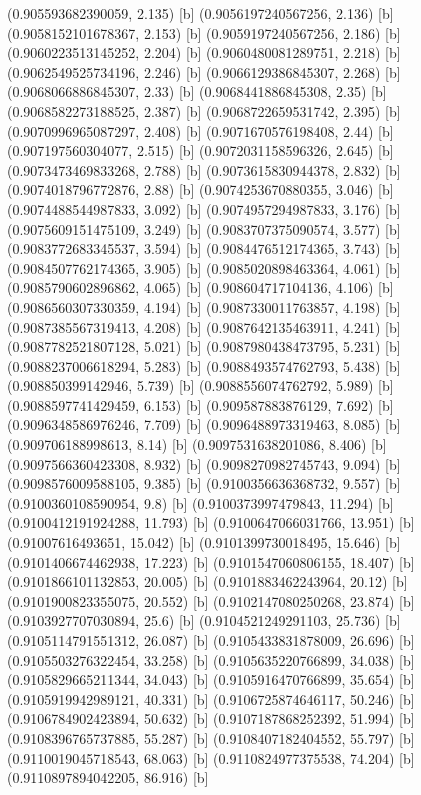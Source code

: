 {{{(0.905593682390059, 2.135) [b] 
(0.9056197240567256, 2.136) [b] 
(0.9058152101678367, 2.153) [b] 
(0.9059197240567256, 2.186) [b] 
(0.9060223513145252, 2.204) [b] 
(0.9060480081289751, 2.218) [b] 
(0.9062549525734196, 2.246) [b] 
(0.9066129386845307, 2.268) [b] 
(0.9068066886845307, 2.33) [b] 
(0.9068441886845308, 2.35) [b] 
(0.9068582273188525, 2.387) [b] 
(0.9068722659531742, 2.395) [b] 
(0.9070996965087297, 2.408) [b] 
(0.9071670576198408, 2.44) [b] 
(0.907197560304077, 2.515) [b] 
(0.9072031158596326, 2.645) [b] 
(0.9073473469833268, 2.788) [b] 
(0.9073615830944378, 2.832) [b] 
(0.9074018796772876, 2.88) [b] 
(0.9074253670880355, 3.046) [b] 
(0.9074488544987833, 3.092) [b] 
(0.9074957294987833, 3.176) [b] 
(0.9075609151475109, 3.249) [b] 
(0.9083707375090574, 3.577) [b] 
(0.9083772683345537, 3.594) [b] 
(0.9084476512174365, 3.743) [b] 
(0.9084507762174365, 3.905) [b] 
(0.9085020898463364, 4.061) [b] 
(0.9085790602896862, 4.065) [b] 
(0.908604717104136, 4.106) [b] 
(0.9086560307330359, 4.194) [b] 
(0.9087330011763857, 4.198) [b] 
(0.9087385567319413, 4.208) [b] 
(0.9087642135463911, 4.241) [b] 
(0.9087782521807128, 5.021) [b] 
(0.9087980438473795, 5.231) [b] 
(0.9088237006618294, 5.283) [b] 
(0.9088493574762793, 5.438) [b] 
(0.908850399142946, 5.739) [b] 
(0.9088556074762792, 5.989) [b] 
(0.9088597741429459, 6.153) [b] 
(0.909587883876129, 7.692) [b] 
(0.9096348586976246, 7.709) [b] 
(0.9096488973319463, 8.085) [b] 
(0.909706188998613, 8.14) [b] 
(0.9097531638201086, 8.406) [b] 
(0.9097566360423308, 8.932) [b] 
(0.9098270982745743, 9.094) [b] 
(0.9098576009588105, 9.385) [b] 
(0.9100356636368732, 9.557) [b] 
(0.9100360108590954, 9.8) [b] 
(0.9100373997479843, 11.294) [b] 
(0.9100412191924288, 11.793) [b] 
(0.9100647066031766, 13.951) [b] 
(0.91007616493651, 15.042) [b] 
(0.9101399730018495, 15.646) [b] 
(0.9101406674462938, 17.223) [b] 
(0.9101547060806155, 18.407) [b] 
(0.9101866101132853, 20.005) [b] 
(0.9101883462243964, 20.12) [b] 
(0.9101900823355075, 20.552) [b] 
(0.9102147080250268, 23.874) [b] 
(0.9103927707030894, 25.6) [b] 
(0.9104521249291103, 25.736) [b] 
(0.9105114791551312, 26.087) [b] 
(0.9105433831878009, 26.696) [b] 
(0.9105503276322454, 33.258) [b] 
(0.9105635220766899, 34.038) [b] 
(0.9105829665211344, 34.043) [b] 
(0.9105916470766899, 35.654) [b] 
(0.9105919942989121, 40.331) [b] 
(0.9106725874646117, 50.246) [b] 
(0.9106784902423894, 50.632) [b] 
(0.9107187868252392, 51.994) [b] 
(0.9108396765737885, 55.287) [b] 
(0.9108407182404552, 55.797) [b] 
(0.9110019045718543, 68.063) [b] 
(0.9110824977375538, 74.204) [b] 
(0.9110897894042205, 86.916) [b] 
}}}
